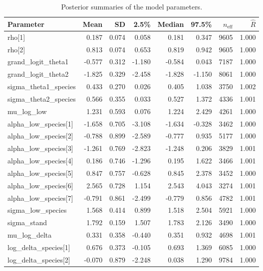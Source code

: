 
\begin{longtable}[t]{lrrrrrrr}
\caption{\label{tab:model_summary}Posterior summaries of the model parameters.}\\
\toprule
Parameter & Mean & SD & 2.5\% & Median & 97.5\% & $n_{\mathrm{eff}}$ & $\hat{R}$\\
\midrule
rho[1] & 0.187 & 0.074 & 0.058 & 0.181 & 0.347 & 9605 & 1.000\\
rho[2] & 0.813 & 0.074 & 0.653 & 0.819 & 0.942 & 9605 & 1.000\\
grand\_logit\_theta1 & -0.577 & 0.312 & -1.180 & -0.584 & 0.043 & 7187 & 1.000\\
grand\_logit\_theta2 & -1.825 & 0.329 & -2.458 & -1.828 & -1.150 & 8061 & 1.000\\
sigma\_theta1\_species & 0.433 & 0.270 & 0.026 & 0.405 & 1.038 & 3750 & 1.002\\
\addlinespace
sigma\_theta2\_species & 0.566 & 0.355 & 0.033 & 0.527 & 1.372 & 4336 & 1.001\\
mu\_log\_low & 1.231 & 0.593 & 0.076 & 1.224 & 2.429 & 4261 & 1.000\\
alpha\_low\_species[1] & -1.658 & 0.705 & -3.108 & -1.634 & -0.328 & 3462 & 1.000\\
alpha\_low\_species[2] & -0.788 & 0.899 & -2.589 & -0.777 & 0.935 & 5177 & 1.000\\
alpha\_low\_species[3] & -1.261 & 0.769 & -2.823 & -1.248 & 0.206 & 3829 & 1.001\\
\addlinespace
alpha\_low\_species[4] & 0.186 & 0.746 & -1.296 & 0.195 & 1.622 & 3466 & 1.001\\
alpha\_low\_species[5] & 0.847 & 0.757 & -0.628 & 0.845 & 2.378 & 3452 & 1.000\\
alpha\_low\_species[6] & 2.565 & 0.728 & 1.154 & 2.543 & 4.043 & 3274 & 1.001\\
alpha\_low\_species[7] & -0.791 & 0.861 & -2.499 & -0.779 & 0.856 & 4782 & 1.001\\
sigma\_low\_species & 1.568 & 0.414 & 0.899 & 1.518 & 2.504 & 5921 & 1.000\\
\addlinespace
sigma\_stand & 1.792 & 0.159 & 1.507 & 1.783 & 2.126 & 3490 & 1.000\\
mu\_log\_delta & 0.331 & 0.358 & -0.440 & 0.351 & 0.932 & 4698 & 1.001\\
log\_delta\_species[1] & 0.676 & 0.373 & -0.105 & 0.693 & 1.369 & 6085 & 1.000\\
log\_delta\_species[2] & -0.070 & 0.879 & -2.248 & 0.038 & 1.290 & 9784 & 1.000\\

\end{longtable}
